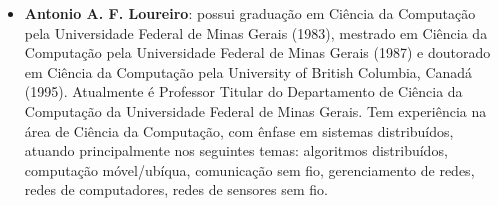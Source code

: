 \documentclass{SBCbookchapter}
\begin{document}
\begin{itemize}
\item \textbf{Antonio A. F. Loureiro}: possui graduação em Ciência da Computação 
pela Universidade Federal de Minas Gerais (1983), mestrado em Ciência da 
Computação pela Universidade Federal de Minas Gerais (1987) e doutorado em 
Ciência da Computação pela University of British Columbia, Canadá (1995). 
Atualmente é Professor Titular do Departamento de Ciência da Computação da 
Universidade Federal de Minas Gerais. Tem experiência na área de Ciência da 
Computação, com ênfase em sistemas distribuídos, atuando principalmente nos 
seguintes temas: algoritmos distribuídos, computação móvel/ubíqua, comunicação 
sem fio, gerenciamento de redes, redes de computadores, redes de sensores sem 
fio.

\end{itemize}
\end{document}
